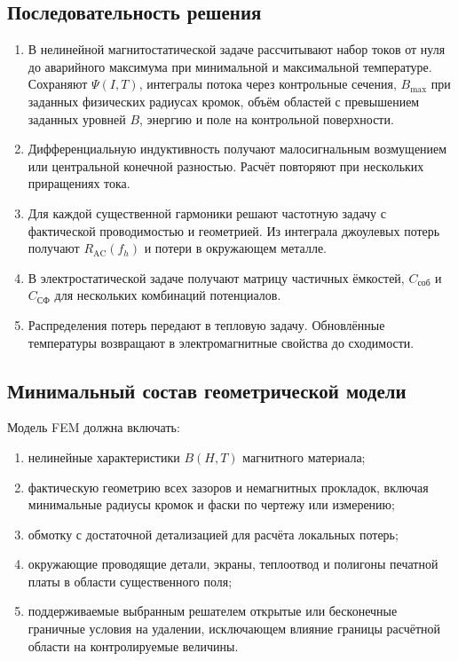 \documentclass[14pt,a4paper]{extarticle}
\begin{document}
\subsection{Последовательность решения}
\label{subsec:fem-sequence}

\begin{enumerate}
\item В нелинейной магнитостатической задаче рассчитывают набор токов от
нуля до аварийного максимума при минимальной и максимальной температуре.
Сохраняют $\Psi(I,T)$, интегралы потока через контрольные сечения,
$B_{\max}$ при заданных физических радиусах кромок, объём областей с
превышением заданных уровней $B$, энергию и поле на контрольной поверхности.
\item Дифференциальную индуктивность получают малосигнальным возмущением или
центральной конечной разностью. Расчёт повторяют при нескольких приращениях
тока.
\item Для каждой существенной гармоники решают частотную задачу с
фактической проводимостью и геометрией. Из интеграла джоулевых потерь получают
$R_{\text{AC}}(f_h)$ и потери в окружающем металле.
\item В электростатической задаче получают матрицу частичных ёмкостей,
$C_{\text{соб}}$ и $C_{\text{СФ}}$ для нескольких комбинаций потенциалов.
\item Распределения потерь передают в тепловую задачу. Обновлённые
температуры возвращают в электромагнитные свойства до сходимости.
\end{enumerate}

\subsection{Минимальный состав геометрической модели}

Модель FEM должна включать:
\begin{enumerate}
\item нелинейные характеристики $B(H,T)$ магнитного материала;
\item фактическую геометрию всех зазоров и немагнитных прокладок, включая
минимальные радиусы кромок и фаски по чертежу или измерению;
 \item обмотку с достаточной детализацией для расчёта локальных потерь;
 \item окружающие проводящие детали, экраны, теплоотвод и полигоны
 печатной платы в области существенного поля;
\item поддерживаемые выбранным решателем открытые или бесконечные граничные
условия на удалении, исключающем влияние границы расчётной области на
контролируемые величины.
\end{enumerate}
\end{document}
